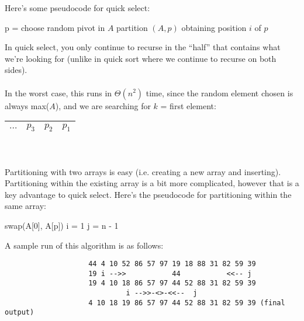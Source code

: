 \documentclass[]{article}
\theoremstyle{definition}
\newcommand{\lecture}[1]{\marginpar{{\footnotesize $\leftarrow$ \underline{#1}}}}
\begin{document}
				Here's some pseudocode for quick select: \\
				\begin{algorithm}[H]
					p = choose random pivot in $A$\;
					partition $(A, p)$ obtaining position $i$ of $p$\;
				\end{algorithm}
				In quick select, you only continue to recurse in the ``half'' that contains what we're looking for (unlike in quick sort where we continue to recurse on both sides).
				\\ \\
				In the worst case, this runs in $\Theta(n^2)$ time, since the random element chosen is always max($A$), and we are searching for $k$ = first element:
				\begin{tabular}{|c|c|c|c|}
					\hline $\ldots$ & $p_3$ & $p_2$ & $p_1$ \\ \hline
				\end{tabular}
				\\ \\
				Partitioning with two arrays is easy (i.e. creating a new array and inserting). Partitioning within the existing array is a bit more complicated, however that is a key advantage to quick select. Here's the pseudocode for partitioning within the same array: \\
				\begin{algorithm}[H]
					swap(A[0], A[p])\;
					i = 1\;
					j = n - 1\;
				\end{algorithm}
				A sample run of this algorithm is as follows:
				\lecture{January 29, 2013} \begin{verbatim}
					44 4 10 52 86 57 97 19 18 88 31 82 59 39
					19 i -->>           44           <<-- j
					19 4 10 18 86 57 97 44 52 88 31 82 59 39
					         i -->>-<>-<<--  j
					4 10 18 19 86 57 97 44 52 88 31 82 59 39 (final output)
				\end{verbatim}
\end{document}
